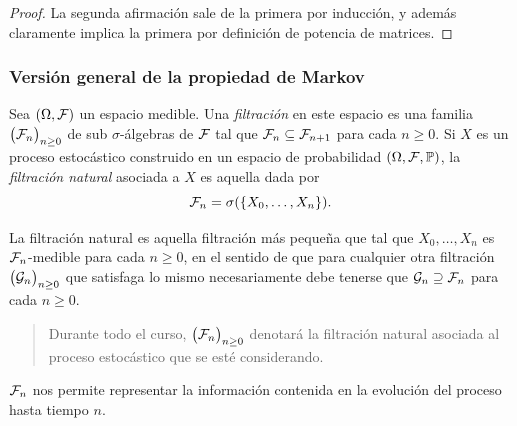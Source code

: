 \begin{proof}
La segunda afirmación sale de la primera por inducción, y además claramente implica la primera por definición de potencia de matrices.
\end{proof}

\subsubsection{Versión general de la propiedad de Markov}

\begin{defn}
Sea $(\Omega,\mathcal{F})$ un espacio medible.
Una \emph{filtración} en este espacio es una familia $\big(\mathcal{F}_n\big)_{n\geq0}$ de sub $\sigma$-álgebras de $\mathcal{F}$ tal que $\mathcal{F}_n\subseteq\mathcal{F}_{n+1}$ para cada $n\geq0$.
\lsep
Si $X$ es un proceso estocástico construido en un espacio de probabilidad $(\Omega,\mathcal{F},\mathbb{P})$, la \emph{filtración natural} asociada a $X$ es aquella dada por
\[\mathcal{F}_n=\sigma(\{X_0,\dotsc,X_n\}).\]
\end{defn}

La filtración natural es aquella filtración más pequeña que tal que $X_0,\dotsc,X_n$ es $\mathcal{F}_n$-medible para cada $n\geq0$, en el sentido de que para cualquier otra filtración $\big(\mathcal{G}_n\big)_{n\geq0}$ que satisfaga lo mismo necesariamente debe tenerse que $\mathcal{G}_n\supseteq\mathcal{F}_n$ para cada $n\geq0$.
\begin{quote}
Durante todo el curso, $\big(\mathcal{F}_n\big)_{n\geq0}$ denotará la filtración natural asociada al proceso estocástico que se esté considerando.
\end{quote}
\lsep
$\mathcal{F}_n$ nos permite representar la información contenida en la evolución del proceso hasta tiempo $n$.

